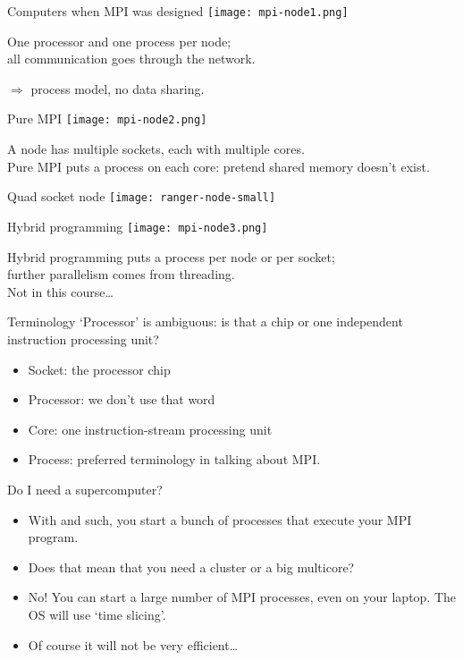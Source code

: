 \begin{numberedframe}{Computers when MPI was designed}
  \texttt{[image: mpi-node1.png]}

  One processor and one  process per node;\\
  all communication goes through the network.

  $\Rightarrow$ process model, no data sharing.
\end{numberedframe}

\begin{numberedframe}{Pure MPI}
  \texttt{[image: mpi-node2.png]}

  A node has multiple sockets, each with multiple cores.\\
  Pure MPI puts a process on each core: pretend shared memory doesn't exist.
\end{numberedframe}

\begin{numberedframe}{Quad socket node}
  \texttt{[image: ranger-node-small]}
\end{numberedframe}

\begin{numberedframe}{Hybrid programming}
  \texttt{[image: mpi-node3.png]}

  Hybrid programming puts a process per node or per socket;\\
  further parallelism comes from threading.\\
  Not in this course\ldots
\end{numberedframe}

\begin{numberedframe}{Terminology}
  `Processor' is ambiguous: is that a chip or one independent
  instruction processing unit?
  \begin{itemize}
  \item Socket: the processor chip
  \item Processor: we don't use that word
  \item Core: one instruction-stream processing unit
  \item Process: preferred terminology in talking about MPI.
  \end{itemize}  
\end{numberedframe}

\begin{numberedframe}{Do I need a supercomputer?}
  \begin{itemize}
  \item With  and such, you start a bunch of processes that
    execute your MPI program.
  \item Does that mean that you need a cluster or a big multicore?
  \item No! You can start a large number of MPI processes, even on
    your laptop. The OS will use `time slicing'.
  \item Of course it will not be very efficient\ldots
  \end{itemize}
\end{numberedframe}

